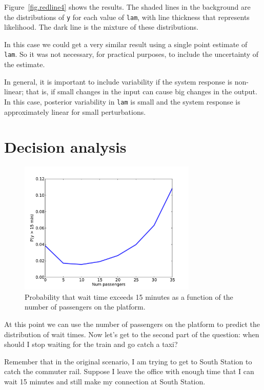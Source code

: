 \documentclass[12pt]{book}
\theoremstyle{exercise}
\begin{document}
Figure~\ref{fig.redline4} shows the results.  The shaded lines
in the background are the distributions of {\tt y} for each value
of {\tt lam}, with line thickness that represents likelihood.
The dark line is the mixture of these distributions.

In this case we could get a very similar result using a single point
estimate of {\tt lam}.  So it was not necessary, for practical purposes,
to include the uncertainty of the estimate.

In general, it is important to include variability if the system
response is non-linear; that is, if small changes in the input can
cause big changes in the output.  In this case, posterior variability
in {\tt lam} is small and the system response is approximately
linear for small perturbations.


\section{Decision analysis}

\begin{figure}
\centerline{\includegraphics[height=2.5in]{figs/redline5.pdf}}
\caption{Probability that wait time exceeds 15 minutes as
a function of the number of passengers on the platform. }
\label{fig.redline5}
\end{figure}

At this point we can use the number of passengers on the platform
to predict the distribution of wait times.  Now
let's get to the second part of the question: when should I stop
waiting for the train and go catch a taxi?

Remember that in the original scenario, I am trying to get to
South Station to catch the commuter rail.  Suppose I leave
the office with enough time that I can wait 15 minutes
and still make my connection at South Station.
\end{document}
